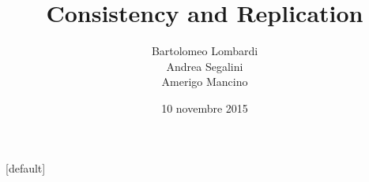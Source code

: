 \documentclass[10pt]{beamer}
\title{Consistency and Replication}
\author{Bartolomeo Lombardi \\ Andrea Segalini \\ Amerigo Mancino}
\date{10 novembre 2015}
\theoremstyle{definition}
\begin{document}
{
\makeatletter
    [default]
    \def\beamer@entrycode{\vspace*{-\headheight}}
\makeatother
\begin{frame}
	\maketitle
\end{frame}
}





\end{document}
